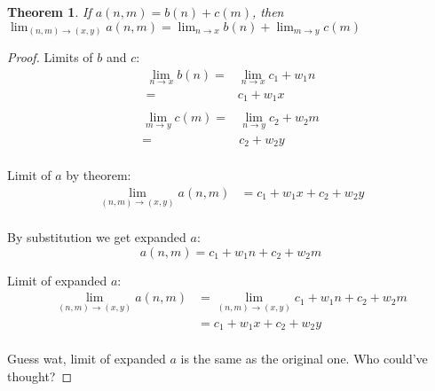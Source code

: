 \documentclass{report}
\newtheorem{theorem}{Theorem}
\begin{document}
        \begin{theorem}
            If $a(n, m) = b(n) + c(m)$, then $\lim_{(n,m) \rightarrow (x,y)} a(n,
            m) = \lim_{n \rightarrow x} b(n) + \lim_{m \rightarrow y} c(m)$
        \end{theorem}

        \begin{proof}
            Limits of $b$ and $c$:
            \begin{equation}
                \begin{split}
                    \lim_{n \rightarrow x} b(n) =& \lim_{n \rightarrow x} c_1 +
                    w_1n\\
                    =& c_1 + w_1x\\
                \end{split}
            \end{equation}
            \begin{equation}
                \begin{split}
                    \lim_{m \rightarrow y} c(m) =& \lim_{n \rightarrow y} c_2 +
                    w_2m\\
                    =& c_2 + w_2y\\
                \end{split}
            \end{equation}

            Limit of $a$ by theorem:
            \begin{equation}
                \begin{split}
                    \lim_{(n,m) \rightarrow (x,y)} a(n, m) &= c_1 + w_1x + c_2 + w_2y\\
                \end{split}
            \end{equation}
            
            By substitution we get expanded $a$:
            \begin{equation}
                a(n, m) = c_1 + w_1n + c_2 + w_2m
            \end{equation}

            Limit of expanded $a$:
            \begin{equation}
                \begin{split}
                    \lim_{(n,m) \rightarrow (x,y)} a(n, m) &= \lim_{(n,m)
                    \rightarrow (x,y)} c_1 + w_1n + c_2 + w_2m\\
                    &= c_1 + w_1x + c_2 + w_2y\\
                \end{split}
            \end{equation}

            Guess wat, limit of expanded $a$ is the same as the original one.
            Who could've thought?
        \end{proof}
\end{document}
